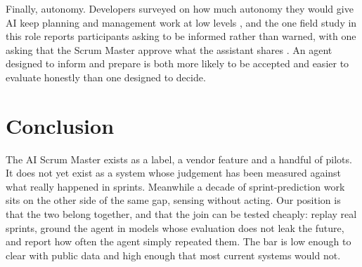\documentclass[conference]{IEEEtran}
\begin{document}
Finally, autonomy. Developers surveyed on how much autonomy they would give AI keep planning and management work at low levels \cite{choudhuri}, and the one field study in this role reports participants asking to be informed rather than warned, with one asking that the Scrum Master approve what the assistant shares \cite{cabrero}. An agent designed to inform and prepare is both more likely to be accepted and easier to evaluate honestly than one designed to decide.

\balance

\section{Conclusion}

The AI Scrum Master exists as a label, a vendor feature and a handful of pilots. It does not yet exist as a system whose judgement has been measured against what really happened in sprints. Meanwhile a decade of sprint-prediction work sits on the other side of the same gap, sensing without acting. Our position is that the two belong together, and that the join can be tested cheaply: replay real sprints, ground the agent in models whose evaluation does not leak the future, and report how often the agent simply repeated them. The bar is low enough to clear with public data and high enough that most current systems would not.
\end{document}
